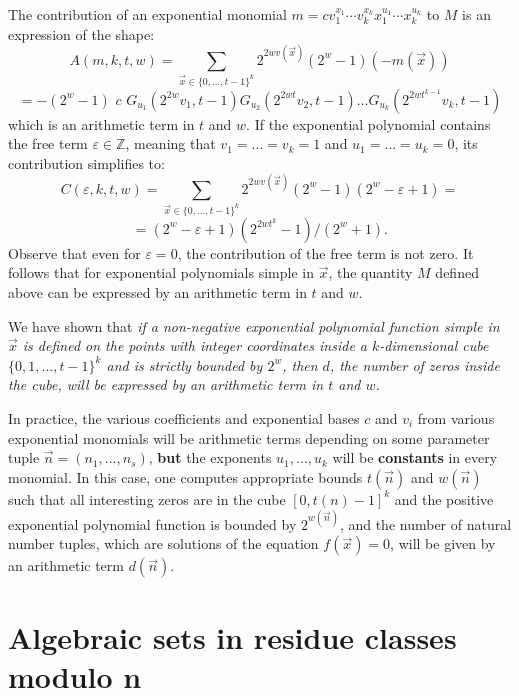 \documentclass[10pt,a4paper]{article}
\theoremstyle{plain}
\begin{document}
The contribution of an exponential monomial $m =   c v_1^{x_1} \cdots v_k^{x_k} x_1^{u_1} \cdots x_k^{u_k}$ to $M$ is an expression of the shape:
$$A(m, k, t, w) = \sum_{\vec{x} \in \{ 0 , \dots , t  - 1 \}^k} 2^{2 w  v ( \vec{x} )} ( 2^{w } - 1 ) ( - m (  \vec{x} ) )  $$ $$ = - ( 2^{w } - 1 ) \,\, c \,\, G_{u_1} ( 2^{ 2 w } v_1 , t  - 1 ) G_{u_2} ( 2^{ 2 w t } v_2 , t  - 1 )\dots G_{u_k} ( 2^{ 2 w  {t }^{k - 1}} v_k , t  -1 )$$
which is an arithmetic term in $t$ and $w$. If the exponential polynomial contains the free term $\varepsilon \in \mathbb Z$, 
meaning that $v_1 = \dots = v_k = 1$ and $u_1 = \dots = u_k = 0$, its contribution simplifies to: 
$$C(\varepsilon , k, t, w) =  \sum_{\vec{x} \in \{ 0 , \dots , t  - 1 \}^k} 2^{2 w  v ( \vec{x} )} ( 2^{w } - 1 ) ( 2^{w } - \varepsilon + 1 ) = $$ $$ = ( 2^{w } - \varepsilon  + 1 ) ( 2^{2 w  {t }^k } - 1 ) / ( 2^{w } + 1 ).$$
Observe that even for $\varepsilon = 0$, the contribution of the free term is not zero. It follows that for  exponential polynomials simple in $\vec x$, the quantity $M$ defined above can be expressed by an arithmetic term in $t$ and $w$. 

We have shown that {\it if a non-negative exponential polynomial function simple in $\vec x$ is defined on the points with integer coordinates inside a $k$-dimensional cube $\{0, 1, \dots, t-1\}^k$ and is strictly bounded by $2^w$, then $d$, the number of zeros inside the cube, will be expressed by an arithmetic term in $t$ and $w$.} 

In practice, the various coefficients and exponential bases $c$ and $v_i$ from various exponential monomials will be arithmetic terms depending on some parameter tuple $\vec n = (n_1, \dots, n_s)$, {\bf but} the exponents $u_1, \dots, u_k$ will be {\bf constants} in every monomial. In this case, one computes appropriate bounds $t(\vec n)$ and $w(\vec n)$ such that all interesting zeros are in the cube $[0, t(n) -1]^k$ and the positive exponential polynomial function is bounded by $2^{w(\vec n)}$, and the number of natural number tuples, which are solutions of the equation $f(\vec x) = 0$, will be given by an arithmetic term $d(\vec n)$. 



\section{Algebraic sets in residue classes modulo n}\label{sets}
\end{document}
